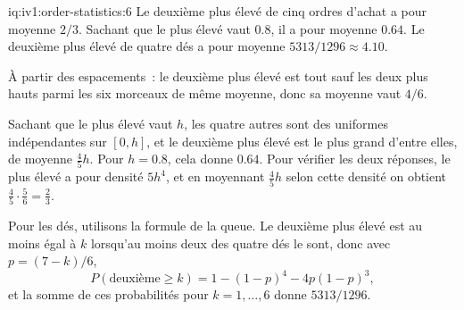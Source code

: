 \begin{solution}{iq:iv1:order-statistics:6}
Le deuxième plus élevé de cinq ordres d'achat a pour moyenne $2/3$. Sachant que le plus élevé vaut $0.8$, il a pour moyenne $0.64$. Le deuxième plus élevé de quatre dés a pour moyenne $5313/1296 \approx 4.10$.

À partir des espacements~: le deuxième plus élevé est tout sauf les deux plus hauts parmi les six morceaux de même moyenne, donc sa moyenne vaut $4/6$.

Sachant que le plus élevé vaut $h$, les quatre autres sont des uniformes indépendantes sur $[0, h]$, et le deuxième plus élevé est le plus grand d'entre elles, de moyenne $\tfrac45 h$. Pour $h = 0.8$, cela donne $0.64$. Pour vérifier les deux réponses, le plus élevé a pour densité $5h^4$, et en moyennant $\tfrac45 h$ selon cette densité on obtient $\tfrac45 \cdot \tfrac56 = \tfrac23$.

Pour les dés, utilisons la formule de la queue. Le deuxième plus élevé est au moins égal à $k$ lorsqu'au moins deux des quatre dés le sont, donc avec $p = (7 - k)/6$,
\[
P(\text{deuxième} \ge k) = 1 - (1 - p)^4 - 4p(1 - p)^3,
\]
et la somme de ces probabilités pour $k = 1, \dots, 6$ donne $5313/1296$.

\end{solution}

